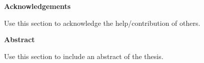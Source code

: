 \documentclass[a4paper,12pt]{report}
\numberwithin{equation}{section}
\begin{document}
\cleardoublepage

\begin{center}
\textsf{\textbf{\Large Acknowledgements}} 
\end{center}
\vspace*{1em}

Use this section to acknowledge the help/contribution of others.


\newpage
\begin{center}
    \textsf{\textbf{\Large Abstract}} 
\end{center}
\vspace*{1em}

Use this section to include an abstract of the thesis.

\newpage
\restoregeometry

\listoffigures

\newpage

\tableofcontents
{} 
\newpage


\newpage
\newpage
\newpage
\newpage
\newpage
\printbibliography
\end{document}
